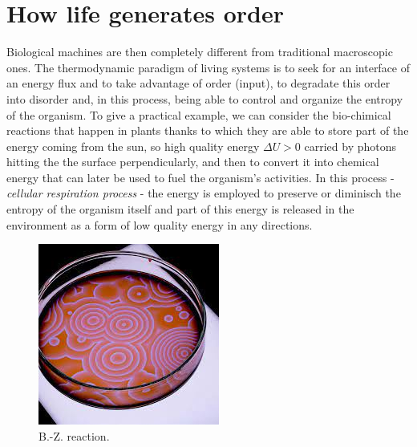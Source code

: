 \documentclass[../main/main.tex]{subfiles}
\begin{document}
\section{How life generates order}



Biological machines are then completely different from traditional macroscopic ones. The thermodynamic paradigm of living systems is to seek for an interface of an energy flux and to take advantage of order (input), to degradate this order into disorder and, in this process, being able to control and organize the entropy of the organism. 
To give a practical example, we can consider the bio-chimical reactions that happen in plants thanks to which they are able to store part of the energy coming from the sun, so high quality energy $\Delta U>0$ carried by photons hitting the the surface perpendicularly, and then to convert it into chemical energy that can later be used to fuel the organism's activities. 
In this process - \emph{cellular respiration process} - the energy is employed to preserve or diminisch the entropy of the organism itself and part of this energy is released in the environment as a form of low quality energy in any directions.

\begin{figure}
    \centering
    \includegraphics[width=0.8\linewidth]{../frontespizio/tikz/1_lesson/Belousov-Zhabotinsky reaction.jpeg}
    \caption{B.-Z. reaction\cite{nat_geo}.}
\end{figure}
\end{document}
